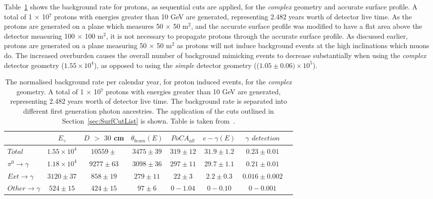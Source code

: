 Table~\ref{tab:SurfProComp} shows the background rate for protons, as sequential cuts are applied, for the \emph{complex} geometry and accurate surface profile. A total of 1 $\times$ 10$^7$ protons with energies greater than 10 GeV are generated, representing 2.482 years worth of detector live time. As the protons are generated on a plane which measures 50 $\times$ 50 m$^{2}$, and the accurate surface profile was modified to have a flat area above the detector measuring 100 $\times$ 100 m$^{2}$, it is not necessary to propagate protons through the accurate surface profile. As discussed earlier, protons are generated on a plane measuring 50 $\times$ 50 m$^{2}$ as protons will not induce background events at the high inclinations which muons do. The increased overburden causes the overall number of background mimicking events to decrease substantially when using the \emph{complex} detector geometry ($1.55\times10^4$), as opposed to using the \emph{simple} detector geometry (($1.05\pm0.06)\times10^5$). \\

\begin{table}
  \caption[The normalised background rate per calendar year, for proton induced events, for the \emph{complex} geometry]
          {The normalised background rate per calendar year, for proton induced events, for the \emph{complex} geometry. A total of 1 $\times$ 10$^7$ protons with energies greater than 10 GeV are generated, representing 2.482 years worth of detector live time. The background rate is separated into different first generation photon ancestries. The application of the cuts outlined in Section~\ref{sec:SurfCutList} is shown. Table is taken from~\citep{MartinsThesis}.}
  \label{tab:SurfProComp}
  \centering
  \scriptsize
  \begin{tabular}{l c c c c c c c }
    \toprule
        & $E_\gamma$ &  $D$ $>$ $30$ cm & $\theta_{beam}(E)$ & $PoCA_{all}$ & $e-\gamma(E)$ & $\gamma$ $detection$ \\
        \midrule
        $Total$          & $1.55\times10^4$ & $10559\pm$  & $3475\pm39$ & $319\pm12$ & $31.9\pm1.2$ & $0.23\pm0.01$ \\

        $\pi^0\to\gamma$ & $1.18\times10^4$ & $9277\pm63$  & $3098\pm36$ & $297\pm11$ & $29.7\pm1.1$ & $0.21\pm0.01$ \\

        $Ext\to\gamma$   & $3120\pm37$      & $858\pm19$   & $279\pm11$  & $22\pm3$   & $2.2\pm0.3$  & $0.016\pm0.002$ \\

        $Other\to\gamma$ & $524\pm15$       & $424\pm15$   & $97\pm6$    & $0-1.04$   & $0-0.10$     & $0-0.001$ \\
        \bottomrule
  \end{tabular}
\end{table}

